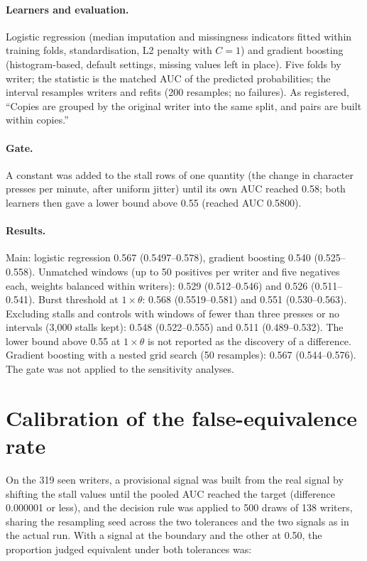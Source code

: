 \paragraph{Learners and evaluation.} Logistic regression (median imputation and missingness indicators fitted within
training folds, standardisation, L2 penalty with $C = 1$) and gradient boosting (histogram-based, default settings,
missing values left in place). Five folds by writer; the statistic is the matched AUC of the predicted probabilities;
the interval resamples writers and refits (200 resamples; no failures). As registered, ``Copies are grouped by the
original writer into the same split, and pairs are built within copies.''

\paragraph{Gate.} A constant was added to the stall rows of one quantity (the change in character presses per minute,
after uniform jitter) until its own AUC reached 0.58; both learners then gave a lower bound above 0.55 (reached AUC
0.5800).

\paragraph{Results.} Main: logistic regression 0.567 (0.5497--0.578), gradient boosting 0.540 (0.525--0.558). Unmatched
windows (up to 50 positives per writer and five negatives each, weights balanced within writers): 0.529 (0.512--0.546)
and 0.526 (0.511--0.541). Burst threshold at $1 \times \theta$: 0.568 (0.5519--0.581) and 0.551 (0.530--0.563).
Excluding stalls and controls with windows of fewer than three presses or no intervals (3,000 stalls kept): 0.548
(0.522--0.555) and 0.511 (0.489--0.532). The lower bound above 0.55 at $1 \times \theta$ is not reported as the
discovery of a difference. Gradient boosting with a nested grid search (50 resamples): 0.567
(0.544--0.576). The gate was not applied to the sensitivity analyses.

\section{Calibration of the false-equivalence rate}
\label{app:calibration}

On the 319 seen writers, a provisional signal was built from the real signal by shifting the stall values until the
pooled AUC reached the target (difference 0.000001 or less), and the decision rule was applied to 500 draws of 138
writers, sharing the resampling seed across the two tolerances and the two signals as in the actual run. With a signal
at the boundary and the other at 0.50, the proportion judged equivalent under both tolerances was:

